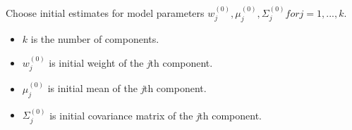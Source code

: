 Choose initial estimates for model parameters $ w_{j}^{(0)}, \mu_{j}^{(0)}, \Sigma_{j}^{(0)} for j = 1, ... , k $.

\begin{itemize}

\item
$ k $ is the number of components.

\item
$ w_{j}^{(0)} $ is initial weight of the \textit{j}th component.

\item
$ \mu_{j}^{(0)} $ is initial mean of the \textit{j}th component.

\item
$ \Sigma_{j}^{(0)} $ is initial covariance matrix of the \textit{j}th component.

\end{itemize}




